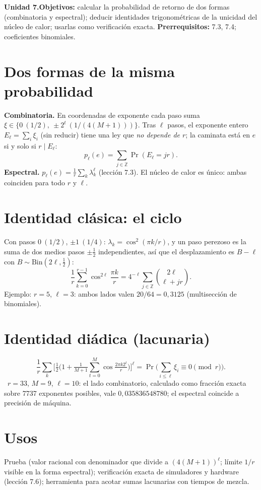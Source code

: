 \documentclass[11pt,a4paper]{article}
\begin{document}

\noindent\textbf{Unidad 7.}\quad\textbf{Objetivos:} calcular la probabilidad de retorno de dos formas (combinatoria y espectral); deducir identidades
trigonométricas de la unicidad del núcleo de calor; usarlas como verificación exacta.
\textbf{Prerrequisitos:} 7.3, 7.4; coeficientes binomiales.

\section{Dos formas de la misma probabilidad}
\textbf{Combinatoria.} En coordenadas de exponente cada paso suma $\xi\in\{0\ (1/2),\ \pm2^t\ (1/(4(M+1)))\}$. Tras $\ell$ pasos, el exponente entero
$E_\ell=\sum_i\xi_i$ (sin reducir) tiene una ley que \emph{no depende de $r$}; la caminata está en $e$ si y solo si $r\mid E_\ell$:
\[p_\ell(e)=\sum_{j\in\mathbb Z}\Pr(E_\ell=jr).\]
\textbf{Espectral.} $p_\ell(e)=\frac1r\sum_k\lambda_k^\ell$ (lección 7.3). El núcleo de calor es único: ambas coinciden para todo $r$ y $\ell$.

\section{Identidad clásica: el ciclo}
Con pasos $0\ (1/2)$, $\pm1\ (1/4)$: $\lambda_k=\cos^2(\pi k/r)$, y un paso perezoso es la suma de dos medios pasos $\pm\frac12$ independientes, así que el
desplazamiento es $B-\ell$ con $B\sim\mathrm{Bin}(2\ell,\frac12)$:
\[\frac1r\sum_{k=0}^{r-1}\cos^{2\ell}\frac{\pi k}r=4^{-\ell}\sum_{j\in\mathbb Z}\binom{2\ell}{\ell+jr}.\]
Ejemplo: $r=5$, $\ell=3$: ambos lados valen $20/64=0{,}3125$ (multisección de binomiales).

\section{Identidad diádica (lacunaria)}
\[\frac1r\sum_k\Big[\tfrac12\Big(1+\tfrac1{M+1}\sum_{t=0}^M\cos\tfrac{2\pi k2^t}r\Big)\Big]^\ell=\Pr\Big(\sum_{i\le\ell}\xi_i\equiv0\pmod r\Big).\]
\evS\ $r=33$, $M=9$, $\ell=10$: el lado combinatorio, calculado como fracción exacta sobre 7737 exponentes posibles, vale $0{,}035836548780$; el espectral coincide a
precisión de máquina.

\section{Usos}
Prueba (valor racional con denominador que divide a $(4(M+1))^\ell$; límite $1/r$ visible en la forma espectral); verificación exacta de simuladores y hardware
(lección 7.6); herramienta para acotar sumas lacunarias con tiempos de mezcla.
\end{document}

